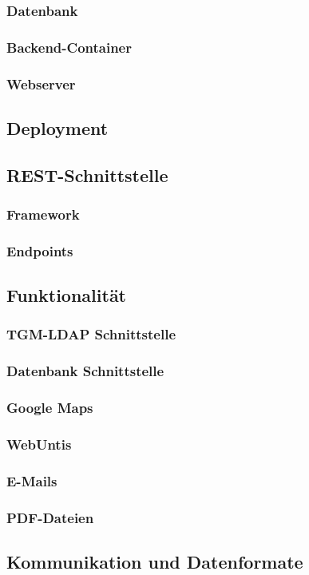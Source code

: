 		\subsubsection{Datenbank}
		\subsubsection{Backend-Container}
		\subsubsection{Webserver}
	\subsection{Deployment}
	\subsection{REST-Schnittstelle}
		\subsubsection{Framework}
		\subsubsection{Endpoints}
	\subsection{Funktionalität}
		\subsubsection{TGM-LDAP Schnittstelle}
		\subsubsection{Datenbank Schnittstelle}
		\subsubsection{Google Maps}
		\subsubsection{WebUntis}
		\subsubsection{E-Mails}
		\subsubsection{PDF-Dateien}
	\subsection{Kommunikation und Datenformate}